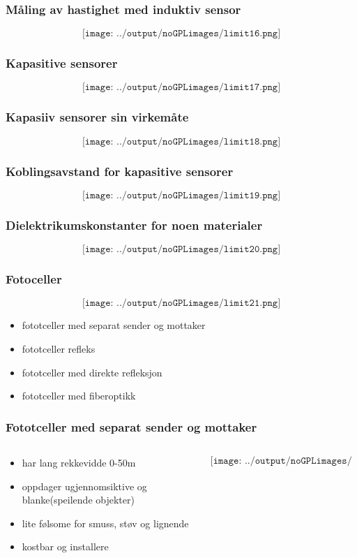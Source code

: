 \documentclass[aspectratio=169,xcolor=dvipsnames]{beamer}
\begin{document}
\begin{frame}
	\frametitle{Måling av hastighet med induktiv sensor}
	$$\texttt{[image: ../output/noGPLimages/limit16.png]}$$
\end{frame}
\begin{frame}
	\frametitle{Kapasitive sensorer}
	$$\texttt{[image: ../output/noGPLimages/limit17.png]}$$
\end{frame}
\begin{frame}
	\frametitle{Kapasiiv sensorer sin virkemåte}
	$$\texttt{[image: ../output/noGPLimages/limit18.png]}$$
\end{frame}
\begin{frame}
	\frametitle{Koblingsavstand for kapasitive sensorer}
	$$\texttt{[image: ../output/noGPLimages/limit19.png]}$$
\end{frame}
\begin{frame}
	\frametitle{Dielektrikumskonstanter for noen materialer}
	$$\texttt{[image: ../output/noGPLimages/limit20.png]}$$
\end{frame}
\begin{frame}
	\frametitle{Fotoceller}
	$$\texttt{[image: ../output/noGPLimages/limit21.png]}$$
	\begin{itemize}
		\item fototceller med separat sender og mottaker
		\item fototceller refleks
		\item fototceller med direkte refleksjon
		\item fototceller med fiberoptikk
	\end{itemize}

	
\end{frame}
\begin{frame}
	\frametitle{Fototceller med separat sender og mottaker}
	\begin{columns}
		\begin{column}{0.5\textwidth}
			\begin{itemize}
				\item har lang rekkevidde 0-50m
				\item oppdager ugjennomsiktive og blanke(speilende objekter)
				\item lite følsome for smuss, støv  og lignende 
				\item kostbar og installere
			\end{itemize}

			
		\end{column}

		\begin{column}{0.5\textwidth}
		$$\texttt{[image: ../output/noGPLimages/limit22.png]}$$
		\end{column}
	\end{columns}


\end{frame}
\end{document}
